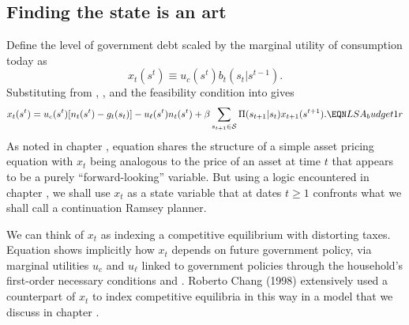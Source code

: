 \subsection{Finding the state is an art}
 Define  the level of government debt
scaled by the marginal utility of consumption  today as
$$ x_t(s^t) \equiv u_c(s^t) b_t(s_t | s^{t-1}). $$
  Substituting from ,  ,  and the feasibility condition 
into  gives
$$   x_t(s^t)  = u_c(s^t) [ n_t(s^t) - g_t(s_t)]  - u_\ell (s^t) n_t(s^t) + \beta \sum_{s_{t+1}\in {\cal S}} \Pi (s_{t+1}| s_t) x_{t+1}(s^{t+1}).
 \EQN LSA_budget1r $$
 As noted in chapter ,   equation  shares  the structure of
 a simple asset pricing equation with $x_t$ being analogous to the price of an asset at time $t$ that appears to be  a purely ``forward-looking'' variable.
   But using a logic encountered in chapter , we shall use $x_t$ as a state variable
 that at dates $t \geq 1$ confronts what we shall call a continuation Ramsey planner.  %

We can think of $x_t$ as indexing a competitive equilibrium with distorting taxes.  Equation  shows implicitly how $x_t$ depends
on future government policy, via  marginal utilities $u_c$ and $u_\ell$  linked to government policies through the household's first-order necessary
conditions  and . Roberto Chang (1998) extensively used a counterpart of $x_t$ to index competitive equilibria in this way in a model that we
discuss in chapter .
%



